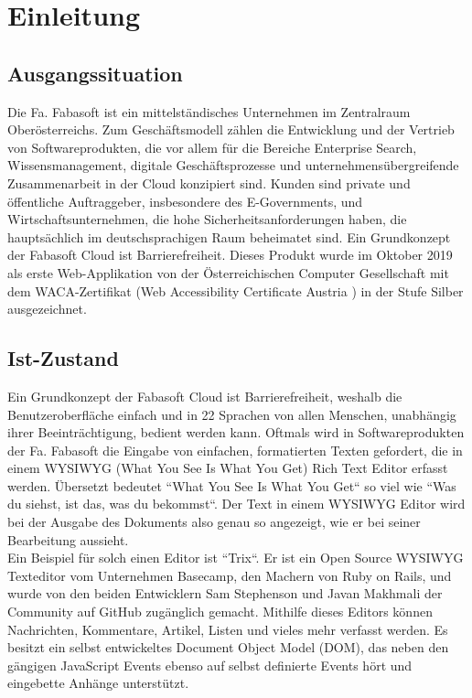 \chapter{Einleitung}
\section{Ausgangssituation}
Die Fa. Fabasoft ist ein mittelständisches Unternehmen im Zentralraum Oberösterreichs. Zum Geschäftsmodell zählen die Entwicklung und der Vertrieb von Softwareprodukten, die vor allem für die Bereiche Enterprise Search, Wissensmanagement, digitale Geschäftsprozesse und unternehmensübergreifende Zusammenarbeit in der Cloud konzipiert sind. Kunden sind private und öffentliche Auftraggeber, insbesondere des E-Governments, und Wirtschaftsunternehmen, die hohe Sicherheitsanforderungen haben, die hauptsächlich im deutschsprachigen Raum beheimatet sind. Ein Grundkonzept der Fabasoft Cloud ist Barrierefreiheit. Dieses Produkt wurde im Oktober 2019 als erste Web-Applikation von der Österreichischen Computer Gesellschaft mit dem WACA-Zertifikat (Web Accessibility Certificate Austria \cite{waca_zertifikate_2020}) in der Stufe Silber ausgezeichnet.

\section{Ist-Zustand}
Ein Grundkonzept der Fabasoft Cloud ist Barrierefreiheit, weshalb die Benutzeroberfläche einfach 
und in 22 Sprachen von allen Menschen, unabhängig ihrer Beeinträchtigung, bedient werden kann. 
Oftmals wird in Softwareprodukten der Fa. Fabasoft die Eingabe von einfachen, formatierten 
Texten gefordert, die in einem WYSIWYG (What You See Is What You Get) Rich Text Editor erfasst 
werden. 
Übersetzt bedeutet ``What You See Is What You Get`` so viel wie ``Was du siehst, ist das, was du 
bekommst``. Der Text in einem WYSIWYG Editor wird bei der Ausgabe des Dokuments also genau so 
angezeigt, wie er bei seiner Bearbeitung aussieht.\\
Ein Beispiel für solch einen Editor ist ``Trix``. Er ist ein Open Source WYSIWYG Texteditor vom 
Unternehmen Basecamp, den Machern von Ruby on Rails, und wurde von den beiden Entwicklern 
Sam Stephenson und Javan Makhmali der Community auf GitHub \cite{basecamp_trix_2013} zugänglich gemacht. 
Mithilfe dieses Editors können 
Nachrichten, Kommentare, Artikel, Listen und vieles mehr verfasst werden. Es besitzt 
ein selbst entwickeltes Document Object Model (DOM), das neben den gängigen JavaScript 
Events ebenso auf selbst definierte Events hört und eingebette Anhänge unterstützt.

